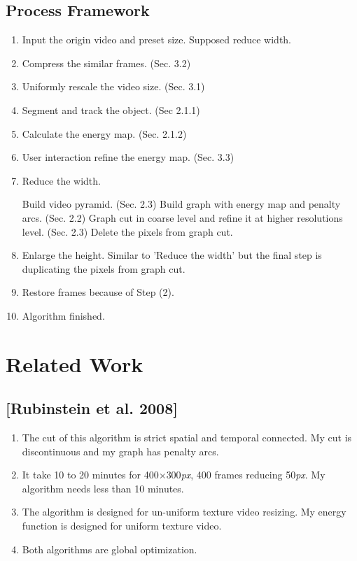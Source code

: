 \documentclass[a4paper, twocolumn]{article}
\begin{document}
		\subsection{Process Framework}
		\begin{enumerate}[(1)]
			\item Input the origin video and preset size. Supposed reduce width.
			\item Compress the similar frames. (Sec. 3.2)
			\item Uniformly rescale the video size. (Sec. 3.1)
			\item Segment and track the object. (Sec 2.1.1)
			\item Calculate the energy map. (Sec. 2.1.2)
			\item User interaction refine the energy map. (Sec. 3.3)
			\item Reduce the width.
				
				\subitem Build video pyramid. (Sec. 2.3)
				\subitem Build graph with energy map and penalty arcs. (Sec. 2.2)
				\subitem Graph cut in coarse level and refine it at higher resolutions level. (Sec. 2.3)
				\subitem Delete the pixels from graph cut.
			\item Enlarge the height.
				\subitem Similar to 'Reduce the width' but the final step is duplicating the pixels from graph cut.
			\item Restore frames because of Step (2).
			\item Algorithm finished.
			
		\end{enumerate}
	
	\section{Related Work}
	
		\subsection{[Rubinstein et al. 2008]}
		\begin{enumerate}[(1)]
			\item The cut of this algorithm is strict spatial and temporal connected. My cut is discontinuous and my graph has penalty arcs.
			\item It take 10 to 20 minutes for 400$\times$300\textit{px}, 400 frames reducing 50\textit{px}. My algorithm needs less than 10 minutes.
			\item The algorithm is designed for un-uniform texture video resizing. My energy function is designed for uniform texture video.
			\item Both algorithms are global optimization.
		\end{enumerate}
		
\end{document}
